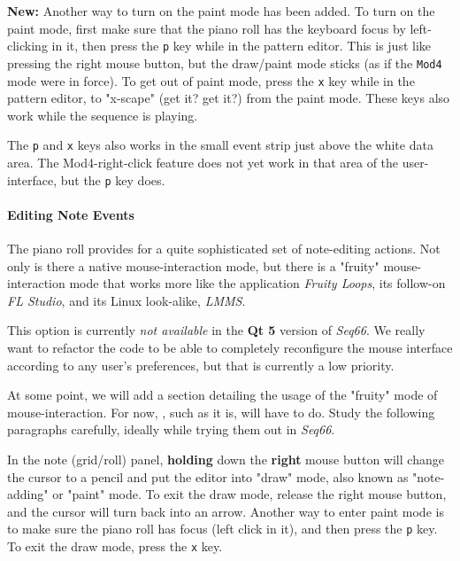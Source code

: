    \textbf{New:}
   Another way to turn on the paint mode has been added.
   To turn on the paint mode, first make sure that the piano roll has the
   keyboard focus by left-clicking in it, then press the
   \texttt{p} key while in the pattern editor.
   This is just like pressing the right mouse button, but the draw/paint mode
   sticks (as if the \texttt{Mod4} mode were in force).
   To get out of paint mode, press the
   \texttt{x} key while in the pattern editor, to "x-scape" (get it? get it?)
   from the paint mode.
   These keys also work while the sequence is playing.

   The \texttt{p} and \texttt{x} keys also works in the small event strip just
   above the white data area.
   The Mod4-right-click feature does not
   yet work in that area of the user-interface, but the \texttt{p} key does.

\paragraph{Editing Note Events}
\label{paragraph:pattern_editor_note_events}

   The piano roll provides for a quite sophisticated set of note-editing
   actions.  Not only is there a native mouse-interaction mode, but there is a
   "fruity" mouse-interaction mode that works more like the application
   \textsl{Fruity Loops}, its follow-on \textsl{FL Studio},
   and its Linux look-alike, \textsl{LMMS}.

   This option is currently \textsl{not available} in the
   \textbf{Qt 5} version of \textsl{Seq66}.
   We really want to refactor the code to be able to 
   completely reconfigure the mouse interface according to any user's
   preferences, but that is currently a low priority.

   \setcounter{ItemCounter}{0}      %

   At some point, we will add a section detailing the usage of the "fruity"
   mode of mouse-interaction.
   For now, , such as it
   is, will have to do.
   Study the following paragraphs carefully, ideally while
   trying them out in \textsl{Seq66}.

	In the note (grid/roll) panel, \textbf{holding}
	down the \textbf{right} mouse button will change the cursor
	to a pencil and put the editor into "draw" mode, 
   also known as "note-adding" or "paint" mode.
   To exit the draw mode, release the right mouse button, and the cursor will
   turn back into an arrow.
   Another way to enter paint mode is to make sure the piano roll has focus
   (left click in it), and then press the \texttt{p} key.
   To exit the draw mode, press the \texttt{x} key.

